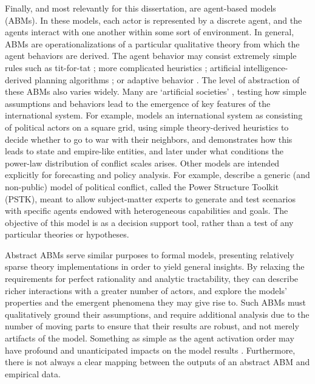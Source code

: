Finally, and most relevantly for this dissertation, are agent-based models (ABMs). In these models, each actor is represented by a discrete agent, and the agents interact with one another within some sort of environment. In general, ABMs are operationalizations of a particular qualitative theory from which the agent behaviors are derived. The agent behavior may consist extremely simple rules such as tit-for-tat \citep{hudson_2004,axelrod_1980}; more complicated heuristics \citep{cederman_1997}; artificial intelligence-derived planning algorithms \citep{taylor_2008}; or adaptive behavior \citep{hoffmann_2005,rouleau_2011}. The level of abstraction of these ABMs also varies widely. Many are `artificial societies' \citep{epstein_1996}, testing how simple assumptions and behaviors lead to the emergence of key features of the international system. For example, \citet{cederman_1997} models an international system as consisting of political actors on a square grid, using simple theory-derived heuristics to decide whether to go to war with their neighbors, and demonstrates how this leads to state and empire-like entities, and later \citep{cederman_2003} under what conditions the power-law distribution of conflict scales \citep{richardson_1948} arises. Other models are intended explicitly for forecasting and policy analysis. For example, \citet{taylor_2008} describe a generic (and non-public) model of political conflict, called the Power Structure Toolkit (PSTK), meant to allow subject-matter experts to generate and test scenarios with specific agents endowed with heterogeneous capabilities and goals. The objective of this model is as a decision support tool, rather than a test of any particular theories or hypotheses.

Abstract ABMs serve similar purposes to formal models, presenting relatively sparse theory implementations in order to yield general insights. By relaxing the requirements for perfect rationality and analytic tractability, they can describe richer interactions with a greater number of actors, and explore the models' properties and the emergent phenomena they may give rise to. Such ABMs must qualitatively ground their assumptions, and require additional analysis due to the number of moving parts to ensure that their results are robust, and not merely artifacts of the model. Something as simple as the agent activation order may have profound and unanticipated impacts on the model results \citep{comer_2014}. Furthermore, there is not always a clear mapping between the outputs of an abstract ABM and empirical data.

